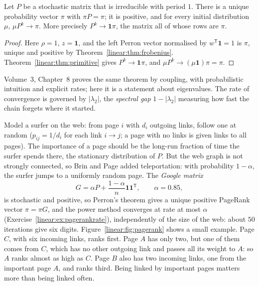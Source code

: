 \begin{corollary}\label{linear:cor:markov}
Let $P$ be a stochastic matrix that is irreducible with period $1$. There is a unique probability vector $\pi$ with $\pi P=\pi$;
it is positive, and for every initial distribution $\mu$, $\mu P^k\to\pi$. More precisely $P^k\to\mathbf 1\pi$, the matrix all of
whose rows are $\pi$.
\end{corollary}
\begin{proof}
Here $\rho=1$, $z=\mathbf 1$, and the left Perron vector normalised by $w^{\mathsf T}\mathbf 1=1$ is $\pi$, unique and positive by
Theorem~\ref{linear:thm:frobenius}. Theorem~\ref{linear:thm:primitive} gives $P^k\to\mathbf 1\pi$, and $\mu P^k\to(\mu\mathbf 1)\pi=\pi$.
\end{proof}

Volume~3, Chapter~8 proves the same theorem by coupling, with probabilistic intuition and explicit rates; here it is a statement
about eigenvalues. The rate of convergence is governed by $|\lambda_2|$, the \emph{spectral gap} $1-|\lambda_2|$ measuring how fast
the chain forgets where it started.

\begin{example}[PageRank]\label{linear:exa:pagerank}
Model a surfer on the web: from page $i$ with $d_i$ outgoing links, follow one at random ($p_{ij}=1/d_i$ for each link
$i\to j$; a page with no links is given links to all pages). The importance of a page should be the long-run fraction of
time the surfer spends there, the stationary distribution of $P$. But the web graph is not strongly connected, so Brin and
Page added teleportation: with probability $1-\alpha$, the surfer jumps to a uniformly random page. The \emph{Google matrix}
\[
G=\alpha P+\frac{1-\alpha}n\mathbf 1\mathbf 1^{\mathsf T},\qquad\alpha=0.85,
\]
is stochastic and positive, so Perron's theorem gives a unique positive PageRank vector $\pi=\pi G$, and the power method
converges at rate at most $\alpha$ (Exercise~\ref{linear:ex:pagerankrate}), independently of the size of the web: about $50$
iterations give six digits. Figure~\ref{linear:fig:pagerank} shows a small example. Page $C$, with six incoming links, ranks first. Page $A$
has only two, but one of them comes from $C$, which has no other outgoing link and passes all its weight to $A$: so $A$ ranks
almost as high as $C$. Page $B$ also has two incoming links, one from the important page $A$, and ranks third. Being linked by
important pages matters more than being linked often.
\end{example}

